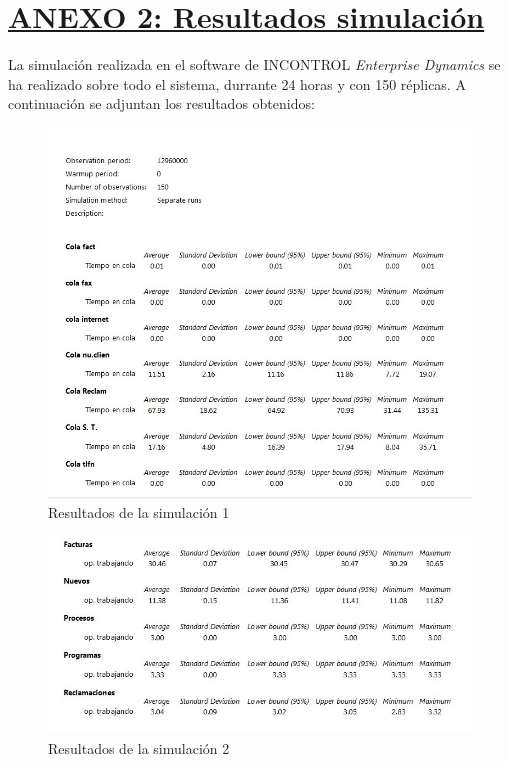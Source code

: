 \section{\textbf{\underline{ANEXO 2: Resultados simulación}}}
La simulación realizada en el software de INCONTROL \textit{Enterprise Dynamics} se ha realizado sobre todo el sistema, durrante 24 horas y con 150 réplicas. A continuación se adjuntan los resultados obtenidos:

\begin{figure}[H]
\begin{center}
\centering
  \includegraphics[width=1\textwidth]{./images/foto1}
  \caption{Resultados de la simulación 1}
  \label{fig: Resultados de la simulacion 1}
\end{center}
\end{figure}
\begin{figure}[H]
\begin{center}
\centering
  \includegraphics[width=1\textwidth]{./images/foto2}
  \caption{Resultados de la simulación 2}
  \label{fig: Resultados de la simulacion 2}
\end{center}
\end{figure}
